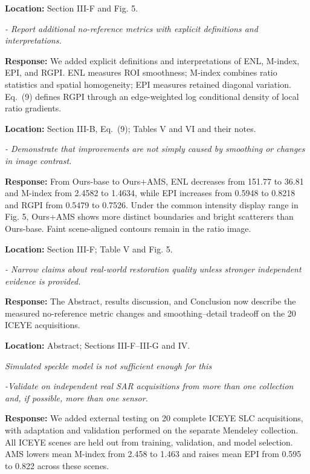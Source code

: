 \documentclass[11pt,letterpaper]{article}
\newcommand{\reviewgroup}[1]{%
  \Needspace{5\baselineskip}%
  \medskip\textit{#1}\par
}
\begin{document}
\textbf{Location:} Section III-F and Fig. 5.

\textit{- Report additional no-reference metrics with explicit definitions and interpretations.}

\textbf{Response:} We added explicit definitions and interpretations of ENL, M-index, EPI, and RGPI. ENL measures ROI smoothness; M-index combines ratio statistics and spatial homogeneity; EPI measures retained diagonal variation. Eq.~(9) defines RGPI through an edge-weighted log conditional density of local ratio gradients.

\textbf{Location:} Section III-B, Eq.~(9); Tables V and VI and their notes.

\textit{- Demonstrate that improvements are not simply caused by smoothing or changes in image contrast.}

\textbf{Response:} From Ours-base to Ours+AMS, ENL decreases from 151.77 to 36.81 and M-index from 2.4582 to 1.4634, while EPI increases from 0.5948 to 0.8218 and RGPI from 0.5479 to 0.7526. Under the common intensity display range in Fig. 5, Ours+AMS shows more distinct boundaries and bright scatterers than Ours-base. Faint scene-aligned contours remain in the ratio image.

\textbf{Location:} Section III-F; Table V and Fig. 5.

\textit{- Narrow claims about real-world restoration quality unless stronger independent evidence is provided.}

\textbf{Response:} The Abstract, results discussion, and Conclusion now describe the measured no-reference metric changes and smoothing--detail tradeoff on the 20 ICEYE acquisitions.

\textbf{Location:} Abstract; Sections III-F--III-G and IV.

\reviewgroup{Simulated speckle model is not sufficient enough for this}

\textit{-Validate on independent real SAR acquisitions from more than one collection and, if possible, more than one sensor.}

\textbf{Response:} We added external testing on 20 complete ICEYE SLC acquisitions, with adaptation and validation performed on the separate Mendeley collection. All ICEYE scenes are held out from training, validation, and model selection. AMS lowers mean M-index from 2.458 to 1.463 and raises mean EPI from 0.595 to 0.822 across these scenes.
\end{document}
